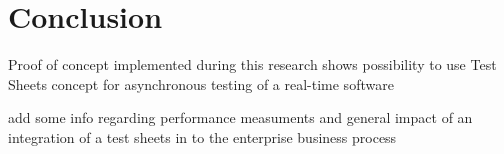\chapter{Conclusion}
\label{chap:conclusion}
Proof of concept implemented during this research shows possibility to use Test Sheets concept for asynchronous testing of a real-time software

add some info regarding performance measuments and general impact of an integration of a test sheets in to the enterprise business process